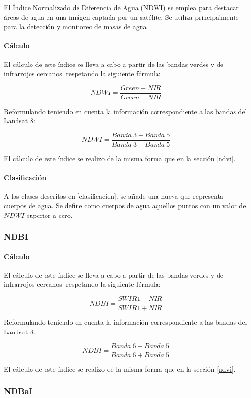 El Índice Normalizado de Diferencia de Agua (NDWI) se emplea para destacar áreas de agua en una imágen captada por un satélite. Se utiliza principalmente para la detección y monitoreo de masas de agua

\paragraph{Cálculo}

El cálculo de este índice se lleva a cabo a partir de las bandas verdes y de infrarrojos cercanos, respetando la siguiente fórmula:

$$NDWI = \frac{Green - NIR}{Green + NIR}$$

Reformulando teniendo en cuenta la información correspondiente a las bandas del Landsat 8:

$$NDWI = \frac{Banda~3-Banda~5}{Banda~3+Banda~5}$$

El cálculo de este índice se realizo de la misma forma que en la sección \ref{ndvi}.


\paragraph{Clasificación} 

A las clases descritas en \ref{clasificacion}, se añade una nueva que representa cuerpos de agua. Se define como cuerpos de agua aquellos puntos con un valor de $NDWI$ superior a cero.

\subsubsection{NDBI}

\paragraph{Cálculo}

El cálculo de este índice se lleva a cabo a partir de las bandas verdes y de infrarrojos cercanos, respetando la siguiente fórmula:

$$NDBI = \frac{SWIR1 - NIR}{SWIR1 + NIR}$$

Reformulando teniendo en cuenta la información correspondiente a las bandas del Landsat 8:

$$NDBI = \frac{Banda~6-Banda~5}{Banda~6+Banda~5}$$

El cálculo de este índice se realizo de la misma forma que en la sección \ref{ndvi}.

\subsubsection{NDBaI}

